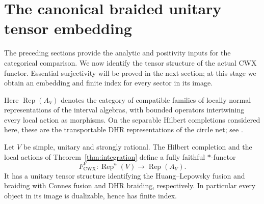 \section{The canonical braided unitary tensor embedding}
\label{sec:comparison}

The preceding sections provide the analytic and positivity inputs for
the categorical comparison.  We now identify the tensor structure of
the actual CWX functor.  Essential surjectivity will be proved in the
next section; at this stage we obtain an embedding and finite index
for every sector in its image.

Here $\operatorname{Rep}(A_V)$ denotes the category of compatible
families of locally normal representations of the interval algebras,
with bounded operators intertwining every local action as morphisms.
On the separable Hilbert completions considered here, these are the
transportable DHR representations of the circle net; see
\cite[Section~6]{KLM}.

\begin{theorem}
\label{thm:cwx-embedding}
Let $V$ be simple, unitary and strongly rational.  The Hilbert
completion and the local actions of Theorem~\ref{thm:integration}
define a fully faithful $*$-functor
\[
 F^V_{\mathrm{CWX}}:
 \operatorname{Rep}^u(V)\longrightarrow\operatorname{Rep}(A_V).
\]
It has a unitary tensor structure identifying the Huang--Lepowsky
fusion and braiding with Connes fusion and DHR braiding, respectively.
In particular every object in its image is dualizable, hence has
finite index.
\end{theorem}

